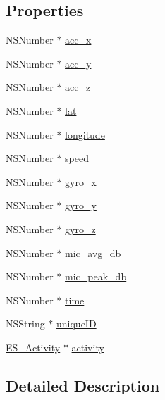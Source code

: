 \subsection*{Properties}
\begin{DoxyCompactItemize}
\item 
N\+S\+Number $\ast$ \hyperlink{interface_e_s___sensor_sample_a048178c83dc5bd7a42e1dea8ac8fb121}{acc\+\_\+x}
\item 
N\+S\+Number $\ast$ \hyperlink{interface_e_s___sensor_sample_a24f0e23ee6eedb5de9c597e25da131bd}{acc\+\_\+y}
\item 
N\+S\+Number $\ast$ \hyperlink{interface_e_s___sensor_sample_af47261f579b98eb8547e8b3ab4713169}{acc\+\_\+z}
\item 
N\+S\+Number $\ast$ \hyperlink{interface_e_s___sensor_sample_a95561a4b148e9898ca9666373671569f}{lat}
\item 
N\+S\+Number $\ast$ \hyperlink{interface_e_s___sensor_sample_af28d24dfa765e3ac17cb633d48c1c742}{longitude}
\item 
N\+S\+Number $\ast$ \hyperlink{interface_e_s___sensor_sample_a82e4afd2f5386a6682e07a06773b1bb5}{speed}
\item 
N\+S\+Number $\ast$ \hyperlink{interface_e_s___sensor_sample_a239b23885403dbfbe398cac46b510ece}{gyro\+\_\+x}
\item 
N\+S\+Number $\ast$ \hyperlink{interface_e_s___sensor_sample_ad697f05431ea1de68db8493da1c5ba32}{gyro\+\_\+y}
\item 
N\+S\+Number $\ast$ \hyperlink{interface_e_s___sensor_sample_a0b08c8967ab6bac73d9822c515c51315}{gyro\+\_\+z}
\item 
N\+S\+Number $\ast$ \hyperlink{interface_e_s___sensor_sample_ae6407a5052a91584e82c9d71e926791e}{mic\+\_\+avg\+\_\+db}
\item 
N\+S\+Number $\ast$ \hyperlink{interface_e_s___sensor_sample_a8fc56541f86bd2862c1f3b8452a0a049}{mic\+\_\+peak\+\_\+db}
\item 
N\+S\+Number $\ast$ \hyperlink{interface_e_s___sensor_sample_a391e903a1a14fbb94489d9bbabeb54c1}{time}
\item 
N\+S\+String $\ast$ \hyperlink{interface_e_s___sensor_sample_aee98559de7d5f09aa17493cdaa459cc4}{unique\+I\+D}
\item 
\hyperlink{interface_e_s___activity}{E\+S\+\_\+\+Activity} $\ast$ \hyperlink{interface_e_s___sensor_sample_add83635aa41883f24950d135836fd059}{activity}
\end{DoxyCompactItemize}


\subsection{Detailed Description}


